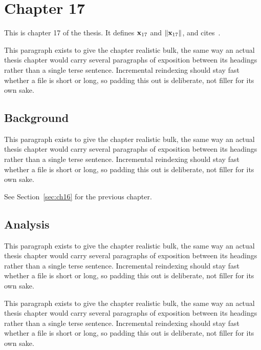 \section{Chapter 17}
\label{sec:ch17}

This is chapter 17 of the thesis. It defines $\mathbf{x}_{17}$ and $\lVert \mathbf{x}_{17} \rVert$, and cites~\cite{ref1}.

This paragraph exists to give the chapter realistic bulk, the same way an actual thesis chapter would carry several paragraphs of exposition between its headings rather than a single terse sentence. Incremental reindexing should stay fast whether a file is short or long, so padding this out is deliberate, not filler for its own sake.

\subsection{Background}
\label{sec:ch17:background}

This paragraph exists to give the chapter realistic bulk, the same way an actual thesis chapter would carry several paragraphs of exposition between its headings rather than a single terse sentence. Incremental reindexing should stay fast whether a file is short or long, so padding this out is deliberate, not filler for its own sake.

See Section~\ref{sec:ch16} for the previous chapter.

\subsection{Analysis}
\label{sec:ch17:analysis}

This paragraph exists to give the chapter realistic bulk, the same way an actual thesis chapter would carry several paragraphs of exposition between its headings rather than a single terse sentence. Incremental reindexing should stay fast whether a file is short or long, so padding this out is deliberate, not filler for its own sake.

This paragraph exists to give the chapter realistic bulk, the same way an actual thesis chapter would carry several paragraphs of exposition between its headings rather than a single terse sentence. Incremental reindexing should stay fast whether a file is short or long, so padding this out is deliberate, not filler for its own sake.
